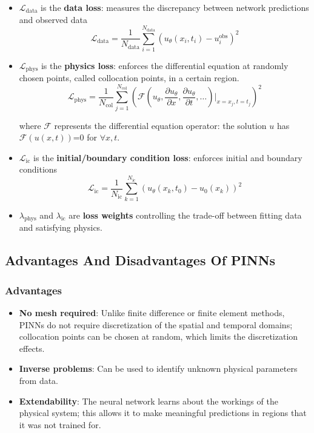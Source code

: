 \documentclass[12pt, a4paper]{report}
\newcommand{\pd}[2]{\frac{\partial #1}{\partial #2}}
\begin{document}
\begin{itemize}
    \item $\mathcal{L}_{\text{data}}$ is the \textbf{data loss}: measures the discrepancy between network predictions and observed data
    \begin{equation}
        \mathcal{L}_{\text{data}} = \frac{1}{N_{\text{data}}} \sum_{i=1}^{N_{\text{data}}} \left(u_\theta(x_i, t_i) - u_i^{\text{obs}}\right)^2
    \end{equation}
    
    \item $\mathcal{L}_{\text{phys}}$ is the \textbf{physics loss}: enforces the differential equation at randomly chosen points, called collocation points, in a certain region.
    \begin{equation}
        \mathcal{L}_{\text{phys}} = \frac{1}{N_{\text{col}}} \sum_{j=1}^{N_{\text{col}}} \left(\mathcal{F}\left(u_\theta, \pd{u_\theta}{x}, \pd{u_\theta}{t}, \ldots\right)\big|_{x=x_j, t=t_j}\right)^2
    \end{equation}
    
    where $\mathcal{F}$ represents the differential equation operator: the solution $u$ has $\mathcal{F}(u(x,t))$=0 for $\forall x,t$.
    
    \item $\mathcal{L}_{\text{ic}}$ is the \textbf{initial/boundary condition loss}: enforces initial and boundary conditions
    \begin{equation}
        \mathcal{L}_{\text{ic}} = \frac{1}{N_{\text{ic}}} \sum_{k=1}^{N_{\text{ic}}} \left(u_\theta(x_k, t_0) - u_0(x_k)\right)^2
    \end{equation}
    
    \item $\lambda_{\text{phys}}$ and $\lambda_{\text{ic}}$ are \textbf{loss weights} controlling the trade-off between fitting data and satisfying physics.
\end{itemize}

\subsection{Advantages And Disadvantages Of PINNs}

\subsubsection*{Advantages}
\begin{itemize}[label=$+$]
    \item \textbf{No mesh required}: Unlike finite difference or finite element methods, PINNs do not require discretization of the spatial and temporal domains; collocation points can be chosen at random, which limits the discretization effects.
    \item \textbf{Inverse problems}: Can be used to identify unknown physical parameters from data.
    \item \textbf{Extendability}: The neural network learns about the workings of the physical system; this allows it to make meaningful predictions in regions that it was not trained for.
\end{itemize}
\end{document}
